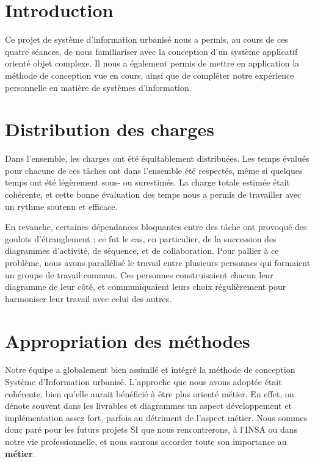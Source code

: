 
\section{Introduction}

Ce projet de système d'information urbanisé nous a permis, au cours de ces quatre séances, de nous familiariser avec la conception d'un système applicatif orienté objet complexe. Il nous a également permis de mettre en application la méthode de conception vue en cours, ainsi que de compléter notre expérience personnelle en matière de systèmes d'information.

\section{Distribution des charges}

Dans l'ensemble, les charges ont été équitablement distribuées. Les temps évalués pour chacune de ces tâches ont dans l'ensemble été respectés, même si quelques temps ont été légèrement sous- ou surestimés. La charge totale estimée était cohérente, et cette bonne évaluation des temps nous a permis de travailler avec un rythme soutenu et efficace.

En revanche, certaines dépendances bloquantes entre des tâche ont provoqué des goulots d'étranglement ; ce fut le cas, en particulier, de la succession des diagrammes d'activité, de séquence, et de collaboration. Pour pallier à ce problème, nous avons parallélisé le travail entre plusieurs personnes qui formaient un groupe de travail commun. Ces personnes construisaient chacun leur diagramme de leur côté, et communiquaient leurs choix régulièrement pour harmoniser leur travail avec celui des autres.

\section{Appropriation des méthodes}

Notre équipe a globalement bien assimilé et intégré la méthode de conception Système d'Information urbanisé. L'approche que nous avons adoptée était cohérente, bien qu'elle aurait bénéficié à être plus orienté métier. En effet, on dénote souvent dans les livrables et diagrammes un aspect développement et implémentation assez fort, parfois au détriment de l'aspect métier. Nous sommes donc paré pour les futurs projets SI que nous rencontrerons, à l'INSA ou dans notre vie professionnelle, et nous saurons accorder toute son importance au \textbf{métier}.

